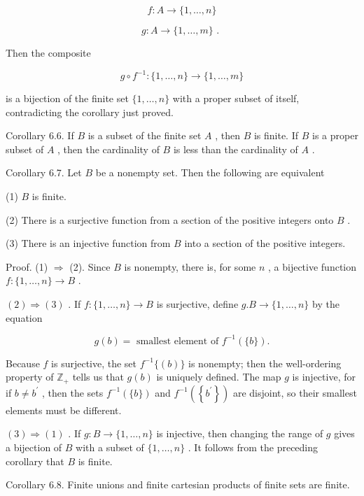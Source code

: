 \[
f : A \rightarrow  \{ 1,\ldots ,n\}
\]

\[
g : A \rightarrow  \{ 1,\ldots ,m\} \text{ . }
\]

Then the composite

\[
g \circ  {f}^{-1} : \{ 1,\ldots ,n\}  \rightarrow  \{ 1,\ldots ,m\}
\]

is a bijection of the finite set \(\{ 1,\ldots ,n\}\) with a proper subset of itself, contradicting the corollary just proved.

Corollary 6.6. If \(B\) is a subset of the finite set \(A\) , then \(B\) is finite. If \(B\) is a proper subset of \(A\) , then the cardinality of \(B\) is less than the cardinality of \(A\) .

Corollary 6.7. Let \(B\) be a nonempty set. Then the following are equivalent

(1) \(B\) is finite.

(2) There is a surjective function from a section of the positive integers onto \(B\) .

(3) There is an injective function from \(B\) into a section of the positive integers.

Proof. (1) \(\Rightarrow\) (2). Since \(B\) is nonempty, there is, for some \(n\) , a bijective function \(f : \{ 1,\ldots ,n\}  \rightarrow  B\) .

\(\left( 2\right)  \Rightarrow  \left( 3\right)\) . If \(f : \{ 1,\ldots ,n\}  \rightarrow  B\) is surjective, define \(g.B \rightarrow  \{ 1,\ldots ,n\}\) by the equation

\[
g\left( b\right)  = \text{ smallest element of }{f}^{-1}\left( {\{ b\} }\right) .
\]

Because \(f\) is surjective, the set \({f}^{-1}\{ \left( b\right) \}\) is nonempty; then the well-ordering property of \({\mathbb{Z}}_{ + }\) tells us that \(g\left( b\right)\) is uniquely defined. The map \(g\) is injective, for if \(b \neq  {b}^{\prime }\) , then the sets \({f}^{-1}\left( {\{ b\} }\right)\) and \({f}^{-1}\left( \left\{  {b}^{\prime }\right\}  \right)\) are disjoint, so their smallest elements must be different.

\(\left( 3\right)  \Rightarrow  \left( 1\right)\) . If \(g : B \rightarrow  \{ 1,\ldots ,n\}\) is injective, then changing the range of \(g\) gives a bijection of \(B\) with a subset of \(\{ 1,\ldots ,n\}\) . It follows from the preceding corollary that \(B\) is finite.

Corollary 6.8. Finite unions and finite cartesian products of finite sets are finite.

